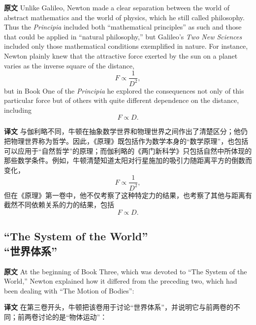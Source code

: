 \documentclass[UTF8,zihao=-4]{ctexart}
\begin{document}
\noindent\textbf{原文} Unlike Galileo, Newton made a clear separation between the world of abstract mathematics and the world of physics, which he still called philosophy. Thus the \emph{Principia} included both ``mathematical principles'' as such and those that could be applied in ``natural philosophy,'' but Galileo's \emph{Two New Sciences} included only those mathematical conditions exemplified in nature. For instance, Newton plainly knew that the attractive force exerted by the sun on a planet varies as the inverse square of the distance,
\[
F \propto \frac{1}{D^{2}},
\]
but in Book One of the \emph{Principia} he explored the consequences not only of this particular force but of others with quite different dependence on the distance, including
\[
F \propto D.
\]
\par\noindent\textbf{译文} 与伽利略不同，牛顿在抽象数学世界和物理世界之间作出了清楚区分；他仍把物理世界称为哲学。因此，《原理》既包括作为数学本身的“数学原理”，也包括可以应用于“自然哲学”的原理；而伽利略的《两门新科学》只包括自然中所体现的那些数学条件。例如，牛顿清楚知道太阳对行星施加的吸引力随距离平方的倒数而变化，
\[
F \propto \frac{1}{D^{2}},
\]
但在《原理》第一卷中，他不仅考察了这种特定力的结果，也考察了其他与距离有截然不同依赖关系的力的结果，包括
\[
F \propto D.
\]
\medskip

\subsection*{``The System of the World''\\“世界体系”}

\noindent\textbf{原文} At the beginning of Book Three, which was devoted to ``The System of the World,'' Newton explained how it differed from the preceding two, which had been dealing with ``The Motion of Bodies'':
\par\noindent\textbf{译文} 在第三卷开头，牛顿把该卷用于讨论“世界体系”，并说明它与前两卷的不同；前两卷讨论的是“物体运动”：
\medskip
\end{document}
